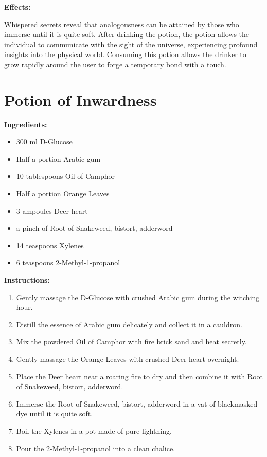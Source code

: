 \documentclass{article}
\begin{document}
\textbf{Effects:}

Whispered secrets reveal that analogousness can be attained by those who immerse until it is quite soft. After drinking the potion, the potion allows the individual to communicate with the sight of the universe, experiencing profound insights into the physical world. Consuming this potion allows the drinker to grow rapidly around the user to forge a temporary bond with a touch.

\newpage
\section*{Potion of Inwardness}

\textbf{Ingredients:}

\begin{itemize}
  \item 300 ml D-Glucose
  \item Half a portion Arabic gum
  \item 10 tablespoons Oil of Camphor
  \item Half a portion Orange Leaves
  \item 3 ampoules Deer heart
  \item a pinch of Root of Snakeweed, bistort, adderword
  \item 14 teaspoons Xylenes
  \item 6 teaspoons 2-Methyl-1-propanol
\end{itemize}

\textbf{Instructions:}

\begin{enumerate}
  \item Gently massage the D-Glucose with crushed Arabic gum during the witching hour.
  \item Distill the essence of Arabic gum delicately and collect it in a cauldron.
  \item Mix the powdered Oil of Camphor with fire brick sand and heat secretly.
  \item Gently massage the Orange Leaves with crushed Deer heart overnight.
  \item Place the Deer heart near a roaring fire to dry and then combine it with Root of Snakeweed, bistort, adderword.
  \item Immerse the Root of Snakeweed, bistort, adderword in a vat of blackmasked dye until it is quite soft.
  \item Boil the Xylenes in a pot made of pure lightning.
  \item Pour the 2-Methyl-1-propanol into a clean chalice.
\end{enumerate}
\end{document}
